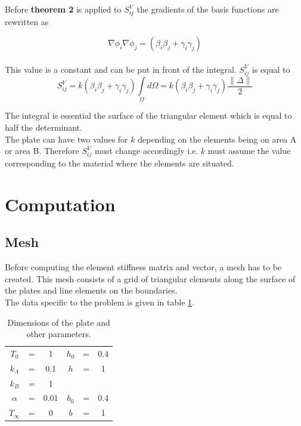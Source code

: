 \documentclass[10pt,a4paper]{article}
\begin{document}
Before 	\textbf{theorem 2} is applied to $S^V_{ij}$ the gradients of the basis functions are rewritten as 

\begin{equation*}
\nabla \phi_i  \nabla  \phi_j = \left(\beta_i \beta_j+\gamma_i \gamma_j\right) 
\end{equation*}
\\
This value is a constant and can be put in front of the  integral. $S^V_{ij}$ is equal to
\begin{equation}
 S^V_{ij} = k  \left(\beta_i \beta_j+\gamma_i \gamma_j\right)\underset{\Omega}{\int} d\Omega =k  \left(\beta_i \beta_j+\gamma_i \gamma_j\right)\frac{\lVert\Delta\rVert}{2}
\end{equation}

The integral is essential the surface of the triangular element which is equal to half the determinant. \\
The plate can have two values for $k$ depending on the elements being on area A or area B. Therefore $S^V_{ij}$ must change accordingly i.e. $k$ must assume the value corresponding to the material where the elements are situated.

\section{Computation}
\subsection{Mesh}
Before computing the element stiffness matrix and vector, a mesh has to be created. This mesh consists of a grid of triangular elements along the surface of the plates and line elements on the boundaries.\\

The data specific to the problem is given in table \ref{table:dim}.

\begin{table}\label{tabel:dim}
\begin{center}

\begin{tabular}{cccccc}
$T_0$ & = & 1 & $h_0$ & = & 0.4\\
$k_A $ & =& 0.1 & $h$ & =&1\\
$k_B$ & = & 1\\
$\alpha$ & = & 0.01 & $b_0$ & = &0.4\\
$T_{\infty}$ &= & 0 & $b$ &=& 1
\end{tabular} 
\end{center}
\caption{Dimensions of the plate and other parameters.}
\label{table:dim}
\end{table}
\end{document}
